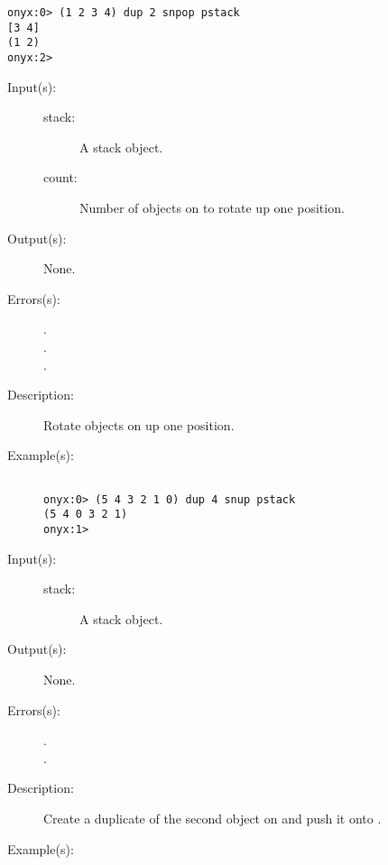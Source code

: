 \begin{description}
\begin{description}
\begin{verbatim}
onyx:0> (1 2 3 4) dup 2 snpop pstack
[3 4]
(1 2)
onyx:2>
		\end{verbatim}
	\end{description}
\label{systemdict:snup}
\item[{\onyxop{stack count}{snup}{--}}: ]
	\begin{description}\item[]
	\item[Input(s): ]
		\begin{description}\item[]
		\item[stack: ]
			A stack object.
		\item[count: ]
			Number of objects on  to rotate up one
			position.
		\end{description}
	\item[Output(s): ] None.
	\item[Errors(s): ]
		\begin{description}\item[]
		\item[.]
		\item[.]
		\item[.]
		\end{description}
	\item[Description: ]
		Rotate  objects on  up one position.
	\item[Example(s): ]\begin{verbatim}

onyx:0> (5 4 3 2 1 0) dup 4 snup pstack
(5 4 0 3 2 1)
onyx:1>
		\end{verbatim}
	\end{description}
\label{systemdict:sover}
\item[{\onyxop{stack}{sover}{--}}: ]
	\begin{description}\item[]
	\item[Input(s): ]
		\begin{description}\item[]
		\item[stack: ]
			A stack object.
		\end{description}
	\item[Output(s): ] None.
	\item[Errors(s): ]
		\begin{description}\item[]
		\item[.]
		\item[.]
		\end{description}
	\item[Description: ]
		Create a duplicate of the second object on  and
		push it onto .
	\item[Example(s): ]\begin{verbatim}


\end{verbatim}
\end{description}
\end{description}
